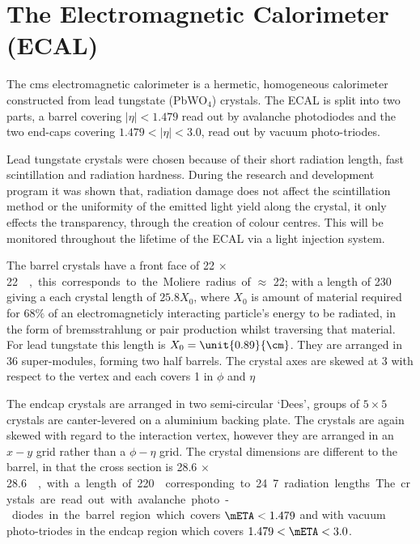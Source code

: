 
\section{The Electromagnetic Calorimeter (ECAL)} %
\label{sec:the_electromagnetic_calorimeter}
The \ac{cms} electromagnetic calorimeter\cite{ref:cmsecaltdr} is a hermetic,
homogeneous calorimeter constructed from lead tungstate (PbWO$_{4}$) crystals.
The ECAL is split into two parts, a barrel covering $|\eta| < 1.479$ read out
by avalanche photodiodes and the two end-caps covering $1.479 < |\eta| < 3.0$,
read out by vacuum photo-triodes.

Lead tungstate crystals were chosen because of their short radiation length,
fast scintillation and radiation hardness. During the research and development
program it was shown that, radiation damage does not affect the scintillation
method or the uniformity of the emitted light yield along the crystal, it only
effects the transparency, through the creation of colour centres. This will be
monitored throughout the lifetime of the ECAL via a light injection
system\cite{Smith:2000p5245}.

The barrel crystals have a front face of \unit{22 $\times$ 22}{\mm\squared},
this corresponds to the Moliere radius of $\approx $ \unit{22}{\mm}; with a
length of \unit{230}{\mm} giving a each crystal length of $25.8 X_{0}$, where
$X_{0}$ is amount of material required for 68$\%$ of an electromagneticly
interacting particle's energy to be radiated, in the form of bremsstrahlung or
pair production whilst traversing that material. For lead tungstate this length
is $X_{0}= \unit{0.89}{\cm}$. They are arranged in 36 super-modules, forming
two half barrels. The crystal axes are skewed at \unit{3}{\degree} with respect
to the vertex and each covers \unit{1}{\degree} in $\phi$ and $\eta$

The endcap crystals are arranged in two semi-circular `Dees', groups of
$5\times 5$ crystals are canter-levered on a aluminium backing plate. The
crystals are again skewed with regard to the interaction vertex, however they
are arranged in an $x-y$ grid rather than a $\phi - \eta$ grid. The crystal
dimensions are different to the barrel, in that the cross section is \unit{28.6
$\times$ 28.6}{\mm\squared}, with a length of \unit{220}{\mm} corresponding to
24.7 radiation lengths

The crystals are read out with avalanche photo-diodes in the barrel region
which covers $\mETA < 1.479$ and with vacuum photo-triodes in the endcap
region which covers $1.479 < \mETA < 3.0$.

